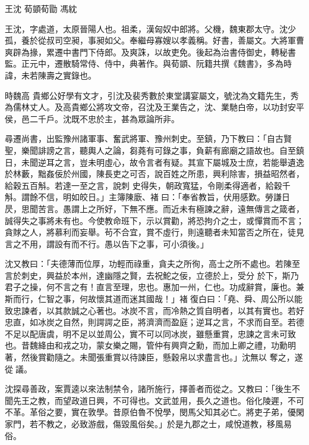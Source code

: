 
\begin{pinyinscope}
王沈
 荀顗荀勖
 馮紞



 王沈，字處道，太原晉陽人也。祖柔，漢匈奴中郎將。父機，魏東郡太守。沈少孤，養於從叔司空昶，事昶如父。奉繼母寡嫂以孝義稱。好書，善屬文。大將軍曹爽辟為掾，累遷中書門下侍郎。及爽誅，以故吏免。後起為治書侍御史，轉秘書監。正元中，遷散騎常侍、侍中，典著作。與荀顗、阮籍共撰《魏書》，多為時諱，未若陳壽之實錄也。



 時魏高
 貴鄉公好學有文才，引沈及裴秀數於東堂講宴屬文，號沈為文籍先生，秀為儒林丈人。及高貴鄉公將攻文帝，召沈及王業告之，沈、業馳白帝，以功封安平侯，邑二千戶。沈既不忠於主，甚為眾論所非。



 尋遷尚書，出監豫州諸軍事、奮武將軍、豫州刺史。至鎮，乃下教曰：「自古賢聖，樂聞誹謗之言，聽輿人之論，芻蕘有可錄之事，負薪有廊廟之語故也。自至鎮日，未聞逆耳之言，豈未明虛心，故令言者有疑。其宣下屬城及士庶，若能舉遺逸於林藪，黜姦佞於州國，陳長吏之可否，說百姓之所患，興利除害，損益昭然者，給穀五百斛。若達一至之言，說刺
 史得失，朝政寬猛，令剛柔得適者，給穀千斛。謂餘不信，明如皎日。」主簿陳廞、褚曰：「奉省教旨，伏用感歎。勞謙日昃，思聞苦言。愚謂上之所好，下無不應。而近未有極諫之辭，遠無傳言之箴者，誠得失之事將未有也。今使教命班下，示以賞勸，將恐拘介之士，或憚賞而不言；貪賕之人，將慕利而妄舉。茍不合宜，賞不虛行，則遠聽者未知當否之所在，徒見言之不用，謂設有而不行。愚以告下之事，可小須後。」



 沈又教曰：「夫德薄而位厚，功輕而祿重，貪夫之所徇，高士之所不處也。若陳至言於刺史，興益於本州，達幽隱之賢，去祝鮀之佞，立德於上，受分
 於下，斯乃君子之操，何不言之有！直言至理，忠也。惠加一州，仁也。功成辭賞，廉也。兼斯而行，仁智之事，何故懷其道而迷其國哉！」褚復白曰：「堯、舜、周公所以能致忠諫者，以其款誠之心著也。冰炭不言，而冷熱之質自明者，以其有實也。若好忠直，如冰炭之自然，則諤諤之臣，將濟濟而盈庭；逆耳之言，不求而自至。若德不足以配唐虞，明不足以並周公，實不可以同冰炭，雖懸重賞，忠諫之言未可致也。昔魏絳由和戎之功，蒙女樂之賜，管仲有興齊之勳，而加上卿之禮，功勳明著，然後賞勸隨之。未聞張重賞以待諫臣，懸穀帛以求盡言也。」沈無以
 奪之，遂從議。



 沈探尋善政，案賈逵以來法制禁令，諸所施行，擇善者而從之。又教曰：「後生不聞先王之教，而望政道日興，不可得也。文武並用，長久之道也。俗化陵遲，不可不革。革俗之要，實在敦學。昔原伯魯不悅學，閔馬父知其必亡。將吏子弟，優閑家門，若不教之，必致游戲，傷毀風俗矣。」於是九郡之士，咸悅道教，移風易俗。




\end{pinyinscope}
